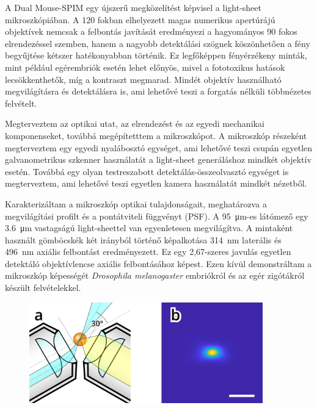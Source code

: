 \documentclass{booklet_style}
\begin{document}
    A Dual Mouse-SPIM egy újszerű megközelítést képvisel a light-sheet mikroszkópiában. A 120 fokban elhelyezett magas numerikus apertúrájú objektívek nemcsak a felbontás javítását eredményezi a hagyományos 90 fokos elrendezéssel szemben, hanem a nagyobb detektálási szögnek köszönhetően a fény begyűjtése kétszer hatékonyabban történik. Ez legfőképpen fényérzékeny minták, mint például egérembriók esetén lehet előnyös, mivel a fototoxikus hatások lecsökkenthetők, míg a kontraszt megmarad. Mindét objektív használható megvilágításra és detektálásra is, ami lehetővé teszi a forgatás nélküli többnézetes felvételt.

    Megterveztem az optikai utat, az elrendezést és az egyedi mechanikai komponenseket, továbbá megépítetttem a mikroszkópot.
    A mikroszkóp részeként megterveztem egy egyedi nyalábosztó egységet, ami lehetővé teszi csupán egyetlen galvanometrikus szkenner használatát a light-sheet generáláshoz mindkét objektív esetén. Továbbá egy olyan testreszabott detektálás-összeolvasztó egységet is megterveztem, ami lehetővé teszi egyetlen kamera használatát mindkét nézetből.

    Karakterizáltam a mikroszkóp optikai tulajdonságait, meghatározva a megvilágítási profilt és a pontátviteli függvényt (PSF).
    A \SI{95}{\micro m}-es látómező egy \SI{3,6}{\micro m} vastagságú light-sheettel van egyenletesen megvilágítva. A mintaként használt gömböcskék két irányból történő képalkotása \SI{314}{nm} laterális és \SI{496}{nm} axiális felbontást eredményezett. Ez egy 2,67-szeres javulás egyetlen detektáló objektívlencse axiális felbontásához képest. Ezen kívül demonstráltam a  mikroszkóp képességét \textit{Drosophila melanogaster} embriókról és az egér zigótákról készült felvételekkel. 
    

    \begin{figure}
      \centering
      \includegraphics[width=0.9\textwidth]{2_DualMouse/120+psf}
      \label{fig:DualMouse}
    \end{figure}
\end{document}

